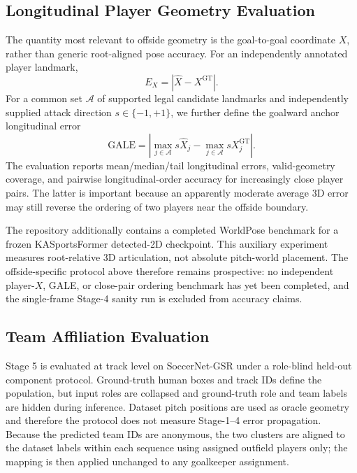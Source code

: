 \documentclass[runningheads]{llncs}
\begin{document}
\subsection{Longitudinal Player Geometry Evaluation}
\label{subsec:player_geometry_eval}
The quantity most relevant to offside geometry is the goal-to-goal coordinate $X$, rather than generic root-aligned pose accuracy. For an independently annotated player landmark,
\begin{equation}
E_X=|\widehat X-X^{\mathrm{GT}}|.
\end{equation}
For a common set $\mathcal{A}$ of supported legal candidate landmarks and independently supplied attack direction $s\in\{-1,+1\}$, we further define the goalward anchor longitudinal error
\begin{equation}
\mathrm{GALE}=\left|\max_{j\in\mathcal A}s\widehat X_j-
\max_{j\in\mathcal A}sX_j^{\mathrm{GT}}\right|.
\end{equation}
The evaluation reports mean/median/tail longitudinal errors, valid-geometry coverage, and pairwise longitudinal-order accuracy for increasingly close player pairs. The latter is important because an apparently moderate average 3D error may still reverse the ordering of two players near the offside boundary.

The repository additionally contains a completed WorldPose benchmark for a frozen KASportsFormer detected-2D checkpoint. This auxiliary experiment measures root-relative 3D articulation, not absolute pitch-world placement. The offside-specific protocol above therefore remains prospective: no independent player-$X$, GALE, or close-pair ordering benchmark has yet been completed, and the single-frame Stage-4 sanity run is excluded from accuracy claims.

\subsection{Team Affiliation Evaluation}
\label{subsec:team_eval}
Stage 5 is evaluated at track level on SoccerNet-GSR under a role-blind held-out component protocol. Ground-truth human boxes and track IDs define the population, but input roles are collapsed and ground-truth role and team labels are hidden during inference. Dataset pitch positions are used as oracle geometry and therefore the protocol does not measure Stage-1--4 error propagation. Because the predicted team IDs are anonymous, the two clusters are aligned to the dataset labels within each sequence using assigned outfield players only; the mapping is then applied unchanged to any goalkeeper assignment.
\end{document}
